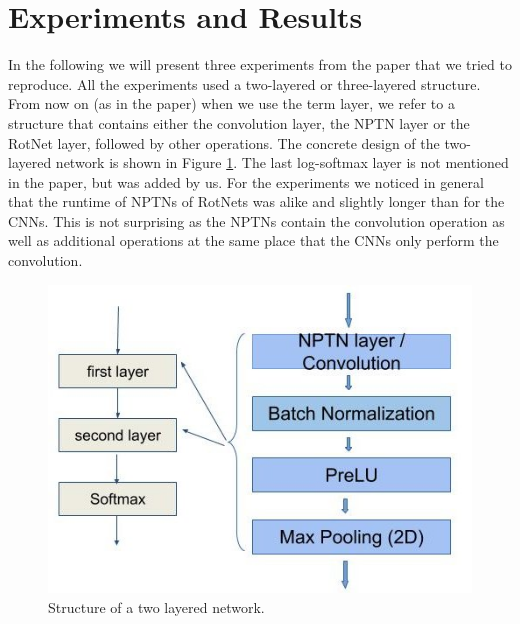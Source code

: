 \documentclass{llncs}
\begin{document}

\section{Experiments and Results}	
In the following we will present three experiments from the paper that we tried to reproduce. 
All the experiments used a two-layered or three-layered structure. From now on (as in the paper) when we use the term layer, we refer to a structure that contains either the convolution layer, the NPTN layer or the RotNet layer, followed by other operations. The concrete design of the two-layered network is shown in Figure \ref{pic:network_structure}. The last log-softmax layer is not mentioned in the paper, but was added by us. 
For the experiments we noticed in general that the runtime of NPTNs of RotNets was alike and slightly longer than for the CNNs. This is not surprising as the NPTNs contain the convolution operation as well as additional operations at the same place that the CNNs only perform the convolution. 

\begin{figure}
	\begin{center}
	\includegraphics[scale=0.35]{result_images/network_structure.jpg}
	\caption{Structure of a two layered network.}
	\label{pic:network_structure}
	\end{center}
\end{figure}
\end{document}
